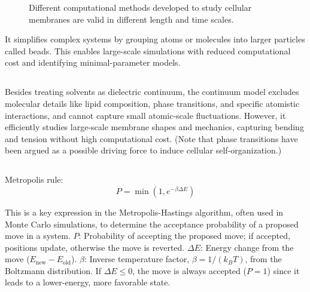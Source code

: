 \documentclass[12pt]{article}
\begin{document}
\begin{flushleft}
\begin{figure}[!ht]
  \centering
  \caption{Different computational methods developed to study cellular membranes are valid in different length and time scales.\cite{chabanon2017systems}}
\end{figure}

It simplifies complex systems by grouping atoms or molecules into larger particles called beads. This enables large-scale simulations with reduced computational cost and identifying minimal-parameter models.



\vspace{-1em}
\subsection* {}


Besides treating solvents as dielectric continuum, the continuum model excludes molecular details like lipid composition, phase transitions, and specific atomistic interactions, and cannot capture small atomic-scale fluctuations. However, it efficiently studies large-scale membrane shapes and mechanics, capturing bending and tension without high computational cost. (Note that phase transitions have been argued as a possible driving force to induce cellular self-organization.)



\subsection*{}





Metropolis rule:
\begin{equation}
P = \min\left(1, e^{-\beta \Delta E}\right)
\end{equation}

This is a key expression in the Metropolis-Hastings algorithm, often used in Monte Carlo simulations, to determine the acceptance probability of a proposed move in a system. $P$: Probability of accepting the proposed move; if accepted, positions update, otherwise the move is reverted.
$\Delta E$: Energy change from the move ($E_{\text{new}} - E_{\text{old}}$).
$\beta$: Inverse temperature factor, $\beta = 1 / (k_B T)$, from the Boltzmann distribution. 
If $\Delta E \leq 0$, the move is always accepted ($P = 1$) since it leads to a lower-energy, more favorable state.
 


\end{flushleft}
\end{document}
